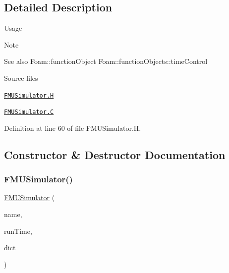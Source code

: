 \subsection{Detailed Description}
\label{_Description}%
 \begin{DoxyParagraph}{Usage}

\end{DoxyParagraph}
\begin{DoxyNote}{Note}

\end{DoxyNote}
\begin{DoxySeeAlso}{See also}
Foam\+::function\+Object Foam\+::function\+Objects\+::time\+Control
\end{DoxySeeAlso}
\begin{DoxyParagraph}{Source files}

\begin{DoxyItemize}
\item \href{../../../home/carlo/data/GeN-Foam/GeN-Foam_ffn/GeN-Foam/GeN-Foam/FMU4FOAM/src/OF_FMU/pyFMUSim/FMUSimulator.H}{\tt F\+M\+U\+Simulator.\+H} 
\item \href{../../../home/carlo/data/GeN-Foam/GeN-Foam_ffn/GeN-Foam/GeN-Foam/FMU4FOAM/src/OF_FMU/pyFMUSim/FMUSimulator.C}{\tt F\+M\+U\+Simulator.\+C} 
\end{DoxyItemize}
\end{DoxyParagraph}


Definition at line 60 of file F\+M\+U\+Simulator.\+H.



\subsection{Constructor \& Destructor Documentation}
\mbox{\label{classFoam_1_1functionObjects_1_1FMUSimulator_a1fb891a905720ac4c1a13883385ea813}} 
\subsubsection{\texorpdfstring{F\+M\+U\+Simulator()}{FMUSimulator()}}
{\footnotesize\ttfamily \hyperlink{classFoam_1_1functionObjects_1_1FMUSimulator}{F\+M\+U\+Simulator} (\begin{DoxyParamCaption}\item[{const word \&}]{name,  }\item[{const Time \&}]{run\+Time,  }\item[{const dictionary \&}]{dict }\end{DoxyParamCaption})}



